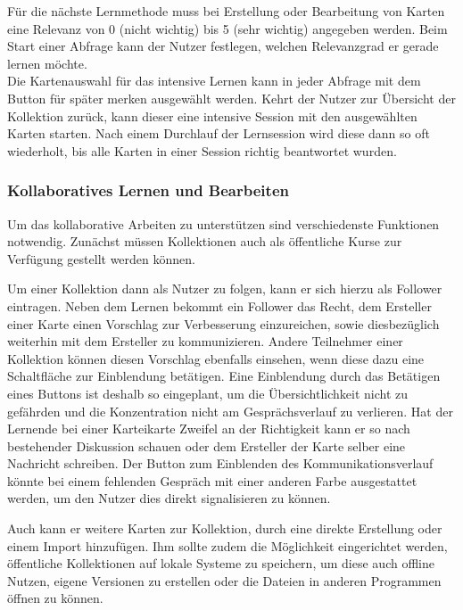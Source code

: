Für die nächste Lernmethode muss bei Erstellung oder Bearbeitung von Karten eine Relevanz von 0 (nicht wichtig) bis 5 (sehr wichtig) angegeben werden. Beim Start einer Abfrage kann der Nutzer festlegen, welchen Relevanzgrad er gerade lernen möchte. \\

Die Kartenauswahl für das intensive Lernen kann in jeder Abfrage mit dem Button \glqq für später merken\grqq{} ausgewählt werden. Kehrt der Nutzer zur Übersicht der Kollektion zurück, kann dieser eine intensive Session mit den ausgewählten Karten starten. Nach einem Durchlauf der Lernsession wird diese dann so oft wiederholt, bis alle Karten in einer Session richtig beantwortet wurden.


\subsubsection{Kollaboratives Lernen und Bearbeiten}
Um das kollaborative Arbeiten zu unterstützen sind verschiedenste Funktionen notwendig. Zunächst müssen Kollektionen auch als öffentliche Kurse zur Verfügung gestellt werden können. 

Um einer Kollektion dann als Nutzer zu folgen, kann er sich hierzu als Follower eintragen. Neben dem Lernen bekommt ein Follower das Recht, dem Ersteller einer Karte einen Vorschlag zur Verbesserung einzureichen, sowie diesbezüglich weiterhin mit dem Ersteller zu kommunizieren. Andere Teilnehmer einer Kollektion können diesen Vorschlag ebenfalls einsehen, wenn diese dazu eine Schaltfläche zur Einblendung betätigen. Eine Einblendung durch das Betätigen eines Buttons ist deshalb so eingeplant, um die Übersichtlichkeit nicht zu gefährden und die Konzentration nicht am Gesprächsverlauf zu verlieren. Hat der Lernende bei einer Karteikarte Zweifel an der Richtigkeit kann er so nach bestehender Diskussion schauen oder dem Ersteller der Karte selber eine Nachricht schreiben. Der Button zum Einblenden des Kommunikationsverlauf könnte bei einem fehlenden Gespräch mit einer anderen Farbe ausgestattet werden, um den Nutzer dies direkt signalisieren zu können.

Auch kann er weitere Karten zur Kollektion, durch eine direkte Erstellung oder einem Import hinzufügen. Ihm sollte zudem die Möglichkeit eingerichtet werden, öffentliche Kollektionen auf lokale Systeme zu speichern, um diese auch offline Nutzen, eigene Versionen zu erstellen oder die Dateien in anderen Programmen öffnen zu können. \\


